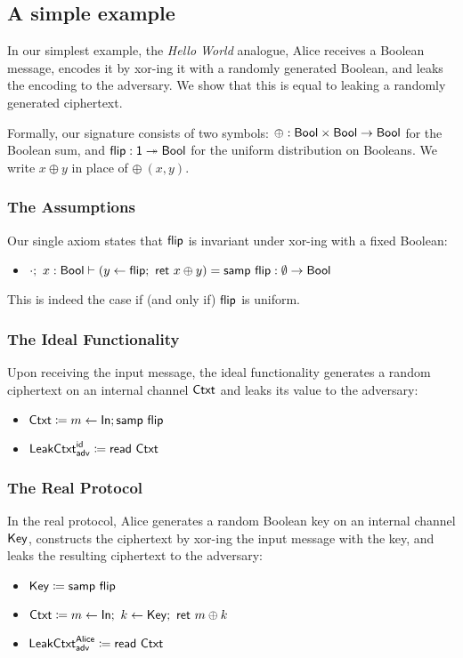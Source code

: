 \subsection{A simple example}

In our simplest example, the \ipdl \emph{Hello World} analogue, Alice receives a Boolean message, encodes it by xor-ing it with a randomly generated Boolean, and leaks the encoding to the adversary. We show that this is equal to leaking a randomly generated ciphertext.

Formally, our signature consists of two symbols: $\oplus : \mathsf{Bool} \times \mathsf{Bool} \to \mathsf{Bool}$ for the Boolean sum, and $\mathsf{flip} : \mathsf{1} \twoheadrightarrow \mathsf{Bool}$ for the uniform distribution on Booleans. We write $x \oplus y$ in place of $\oplus \ (x,y)$.

\subsubsection{The Assumptions}
Our single axiom states that $\mathsf{flip}$ is invariant under xor-ing with a fixed Boolean:
\begin{itemize}
\item $\cdot; \ x : \mathsf{Bool} \vdash (y \leftarrow \mathsf{flip}; \ \mathsf{ret} \ x \oplus y) = \mathsf{samp} \ \mathsf{flip} : \emptyset \to \mathsf{Bool}$
\end{itemize}
This is indeed the case if (and only if) $\mathsf{flip}$ is uniform.

\subsubsection{The Ideal Functionality}
Upon receiving the input message, the ideal functionality generates a random ciphertext on an internal channel $\mathsf{Ctxt}$ and leaks its value to the adversary:
\begin{itemize}
\item $\mathsf{Ctxt} \coloneqq m \leftarrow \mathsf{In}; \mathsf{samp} \ \mathsf{flip}$ 
\item $\mathsf{LeakCtxt}^{\mathsf{id}}_{\mathsf{adv}} \coloneqq \mathsf{read} \ \mathsf{Ctxt}$
\end{itemize}

\subsubsection{The Real Protocol}
In the real protocol, Alice generates a random Boolean key on an internal channel $\mathsf{Key}$, constructs the ciphertext by xor-ing the input message with the key, and leaks the resulting ciphertext to the adversary:
\begin{itemize}
\item $\mathsf{Key} \coloneqq \mathsf{samp} \ \mathsf{flip}$
\item $\mathsf{Ctxt} \coloneqq m \leftarrow \mathsf{In}; \ k \leftarrow \mathsf{Key}; \ \mathsf{ret} \ m \oplus k$
\item $\mathsf{LeakCtxt}^{\mathsf{Alice}}_{\mathsf{adv}} \coloneqq \mathsf{read} \ \mathsf{Ctxt}$
\end{itemize}

